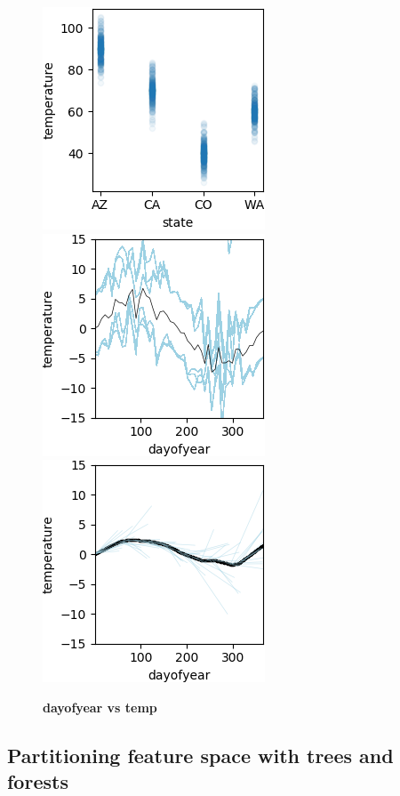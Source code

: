 \documentclass[12pt]{article}
\begin{document}
\begin{figure}[htbp]
\begin{center}
\includegraphics[scale=0.7]{images/state_vs_temp.png}
\includegraphics[scale=0.7]{images/dayofyear_vs_temp_pdp.png}
\includegraphics[scale=0.7]{images/dayofyear_vs_temp_stratpd.png}
\caption{{\bf  dayofyear  vs temp}}
\label{fig:dayofyear_vs_temp}
\end{center}
\end{figure}

\subsection{Partitioning feature space with trees and forests}
\end{document}
